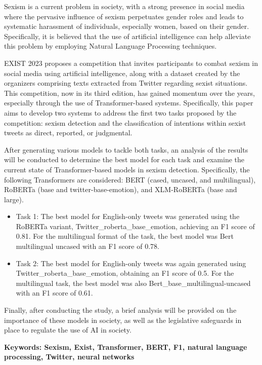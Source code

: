 Sexism is a current problem in society, with a strong presence in social media where the pervasive influence of sexism perpetuates gender roles and leads to systematic harassment of individuals, especially women, based on their gender. Specifically, it is believed that the use of artificial intelligence can help alleviate this problem by employing Natural Language Processing techniques.

EXIST 2023 proposes a competition that invites participants to combat sexism in social media using artificial intelligence, along with a dataset created by the organizers comprising texts extracted from Twitter regarding sexist situations. This competition, now in its third edition, has gained momentum over the years, especially through the use of Transformer-based systems. Specifically, this paper aims to develop two systems to address the first two tasks proposed by the competition: sexism detection and the classification of intentions within sexist tweets as direct, reported, or judgmental.

After generating various models to tackle both tasks, an analysis of the results will be conducted to determine the best model for each task and examine the current state of Transformer-based models in sexism detection. Specifically, the following Transformers are considered: BERT (cased, uncased, and multilingual), RoBERTa (base and twitter-base-emotion), and XLM-RoBERTa (base and large).

\begin{itemize}
\item Task 1: The best model for English-only tweets was generated using the RoBERTa variant, Twitter\_roberta\_base\_emotion, achieving an F1 score of 0.81. For the multilingual format of the task, the best model was Bert multilingual uncased with an F1 score of 0.78.
\item Task 2: The best model for English-only tweets was again generated using Twitter\_roberta\_base\_emotion, obtaining an F1 score of 0.5. For the multilingual task, the best model was also Bert\_base\_multilingual-uncased with an F1 score of 0.61.
\end{itemize}

Finally, after conducting the study, a brief analysis will be provided on the importance of these models in society, as well as the legislative safeguards in place to regulate the use of AI in society.

\textbf{Keywords: Sexism, Exist, Transformer, BERT, F1, natural language processing, Twitter, neural networks}